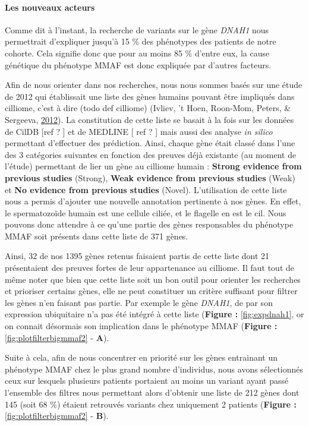 \documentclass[12pt,twoside]{reedthesis}
\theoremstyle{definition}
\theoremstyle{definition}
\theoremstyle{remark}
\begin{document}
  \newpage
  
  \paragraph{Les nouveaux acteurs}\label{les-nouveaux-acteurs}
  
  Comme dit à l'instant, la recherche de variants sur le gène \emph{DNAH1}
  nous permettrait d'expliquer jusqu'à 15 \% des phénotypes des patients
  de notre cohorte. Cela signifie donc que pour au moins 85 \% d'entre
  eux, la cause génétique du phénotype MMAF est donc expliquée par
  d'autres facteurs.
  
  Afin de nous orienter dans nos recherches, nous nous sommes basés sur
  une étude de 2012 qui établissait une liste des gènes humains pouvant
  être impliqués dans cilliome, c'est à dire (todo def cilliome) (Ivliev,
  't Hoen, Roon-Mom, Peters, \& Sergeeva,
  \protect\hyperlink{ref-Ivliev2012}{2012}). La constitution de cette
  liste se basait à la fois sur les données de CilDB {[}ref ? {]} et de
  MEDLINE {[} ref ? {]} mais aussi des analyse \emph{in silico} permettant
  d'effectuer des prédiction. Ainsi, chaque gène était classé dans l'une
  des 3 catégories suivantes en fonction des preuves déjà existante (au
  moment de l'étude) permettant de lier un gène au cilliome humain :
  \textbf{Strong evidence from previous studies} (Strong), \textbf{Weak
  evidence from previous studies} (Weak) et \textbf{No evidence from
  previous studies} (Novel). L'utilisation de cette liste nous a permis
  d'ajouter une nouvelle annotation pertinente à nos gènes. En effet, le
  spermatozoïde humain est une cellule ciliée, et le flagelle en est le
  cil. Nous pouvons donc attendre à ce qu'une partie des gènes
  responsables du phénotype MMAF soit présents dans cette liste de 371
  gènes.
  
  Ainsi, 32 de nos 1395 gènes retenus faisaient partis de cette liste dont
  21 présentaient des preuves fortes de leur appartenance au cilliome. Il
  faut tout de même noter que bien que cette liste soit un bon outil pour
  orienter les recherches et prioriser certains gènes, elle ne peut
  constituer un critère suffisant pour filtrer les gènes n'en faisant pas
  partie. Par exemple le gène \emph{DNAH1}, de par son expression
  ubiquitaire n'a pas été intégré à cette liste (\textbf{Figure :
  }\ref{fig:expdnah1}, or on connait désormais son implication dans le
  phénotype MMAF (\textbf{Figure : }\ref{fig:plotfilterbigmmaf2} -
  \textbf{A}).
  
  Suite à cela, afin de nous concentrer en priorité sur les gènes
  entrainant un phénotype MMAF chez le plus grand nombre d'individus, nous
  avons sélectionnés ceux sur lesquels plusieurs patients portaient au
  moins un variant ayant passé l'ensemble des filtres nous permettant
  alors d'obtenir une liste de 212 gènes dont 145 (soit 68 \%) étaient
  retrouvés variants chez uniquement 2 patients (\textbf{Figure :
  }\ref{fig:plotfilterbigmmaf2} - \textbf{B}).
  
\end{document}
